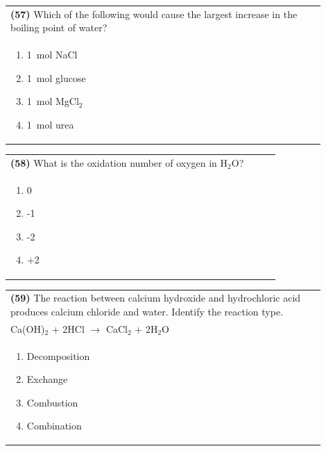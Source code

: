 \documentclass{article}
\begin{document}
\noindent\begin{tabular}{|p{0.9\linewidth}|}
\hline
\textbf{(57)} Which of the following would cause the largest increase in the boiling point of water?\\[0.2cm]
\begin{minipage}[t]{0.85\linewidth}
\begin{enumerate}[label=\alph*.]
\item 1~mol NaCl
\item 1~mol glucose
\item 1~mol MgCl$_2$
\item 1~mol urea
\end{enumerate}
\end{minipage}\\[0.2cm]
\hline
\end{tabular}

\noindent\begin{tabular}{|p{0.9\linewidth}|}
\hline
\textbf{(58)} What is the oxidation number of oxygen in H$_2$O?\\[0.2cm]
\begin{minipage}[t]{0.85\linewidth}
\begin{enumerate}[label=\alph*.]
\item 0
\item -1
\item -2
\item +2
\end{enumerate}
\end{minipage}\\[0.2cm]
\hline
\end{tabular}

\noindent\begin{tabular}{|p{0.9\linewidth}|}
\hline
\textbf{(59)} The reaction between calcium hydroxide and hydrochloric acid produces calcium chloride and water. Identify the reaction type.\\[0.2cm]
Ca(OH)$_2$ + 2HCl $\rightarrow$ CaCl$_2$ + 2H$_2$O\\[0.2cm]
\begin{minipage}[t]{0.85\linewidth}
\begin{enumerate}[label=\alph*.]
\item Decomposition
\item Exchange
\item Combustion
\item Combination
\end{enumerate}
\end{minipage}\\[0.2cm]
\hline
\end{tabular}
\end{document}
